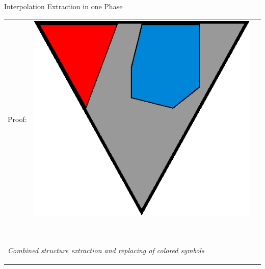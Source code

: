 \documentclass[final,compress]{beamer}
\begin{document}
\newcommand{\onePhaseArrowLabel}{Combined structure extraction and replacing of colored symbols}

\subsection{}
\begin{frame}{Interpolation Extraction in one Phase}
	\small
	\begin{tabular}{p{}ll}

		Proof: 
		&

		\multicolumn{1}{m{\fakemulticolwidth}}{
			\includegraphics[width=\proofwidth]{figures/two_phase_draft_proof}
		}
		&
		\vspace*{0.2em}
		\\

		\multicolumn{2}{l}{
			\proofindent{\stagearrow} ~\parbox[c]{15em}{\raggedright\emph{ \onePhaseArrowLabel } }
			\vspace*{0.2em}
		}
		\\


\end{tabular}
\end{frame}
\end{document}

